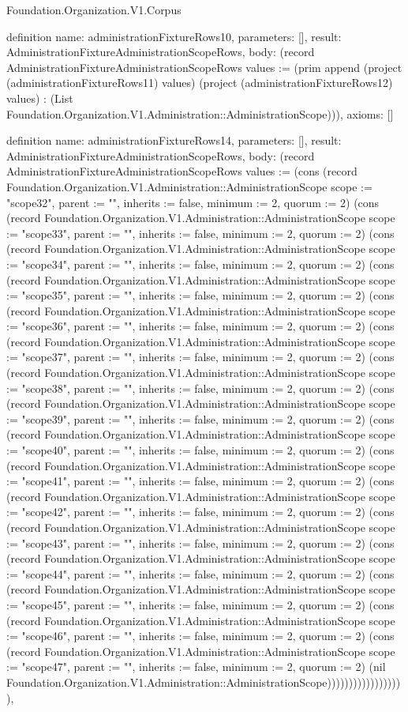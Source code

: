 \begin{lexlean}{Foundation.Organization.V1.Corpus}
\begin{semanticmodule}
definition{
  name: administrationFixtureRows10,
  parameters: [],
  result: AdministrationFixtureAdministrationScopeRows,
  body: (record AdministrationFixtureAdministrationScopeRows {values := (prim append (project (administrationFixtureRows11) values) (project (administrationFixtureRows12) values) : (List Foundation.Organization.V1.Administration::AdministrationScope))}),
  axioms: []
}

definition{
  name: administrationFixtureRows14,
  parameters: [],
  result: AdministrationFixtureAdministrationScopeRows,
  body: (record AdministrationFixtureAdministrationScopeRows {values := (cons (record Foundation.Organization.V1.Administration::AdministrationScope {scope := "scope32", parent := "", inherits := false, minimum := 2, quorum := 2}) (cons (record Foundation.Organization.V1.Administration::AdministrationScope {scope := "scope33", parent := "", inherits := false, minimum := 2, quorum := 2}) (cons (record Foundation.Organization.V1.Administration::AdministrationScope {scope := "scope34", parent := "", inherits := false, minimum := 2, quorum := 2}) (cons (record Foundation.Organization.V1.Administration::AdministrationScope {scope := "scope35", parent := "", inherits := false, minimum := 2, quorum := 2}) (cons (record Foundation.Organization.V1.Administration::AdministrationScope {scope := "scope36", parent := "", inherits := false, minimum := 2, quorum := 2}) (cons (record Foundation.Organization.V1.Administration::AdministrationScope {scope := "scope37", parent := "", inherits := false, minimum := 2, quorum := 2}) (cons (record Foundation.Organization.V1.Administration::AdministrationScope {scope := "scope38", parent := "", inherits := false, minimum := 2, quorum := 2}) (cons (record Foundation.Organization.V1.Administration::AdministrationScope {scope := "scope39", parent := "", inherits := false, minimum := 2, quorum := 2}) (cons (record Foundation.Organization.V1.Administration::AdministrationScope {scope := "scope40", parent := "", inherits := false, minimum := 2, quorum := 2}) (cons (record Foundation.Organization.V1.Administration::AdministrationScope {scope := "scope41", parent := "", inherits := false, minimum := 2, quorum := 2}) (cons (record Foundation.Organization.V1.Administration::AdministrationScope {scope := "scope42", parent := "", inherits := false, minimum := 2, quorum := 2}) (cons (record Foundation.Organization.V1.Administration::AdministrationScope {scope := "scope43", parent := "", inherits := false, minimum := 2, quorum := 2}) (cons (record Foundation.Organization.V1.Administration::AdministrationScope {scope := "scope44", parent := "", inherits := false, minimum := 2, quorum := 2}) (cons (record Foundation.Organization.V1.Administration::AdministrationScope {scope := "scope45", parent := "", inherits := false, minimum := 2, quorum := 2}) (cons (record Foundation.Organization.V1.Administration::AdministrationScope {scope := "scope46", parent := "", inherits := false, minimum := 2, quorum := 2}) (cons (record Foundation.Organization.V1.Administration::AdministrationScope {scope := "scope47", parent := "", inherits := false, minimum := 2, quorum := 2}) (nil Foundation.Organization.V1.Administration::AdministrationScope)))))))))))))))))}),
}
\end{semanticmodule}
\end{lexlean}

